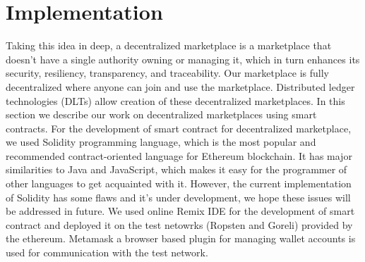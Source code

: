 \chapter{Implementation}
\label{cha:implementation}

Taking this idea in deep, a decentralized marketplace is a marketplace that doesn't have a single authority owning or managing it, which in turn enhances its security, resiliency, transparency, and traceability. Our marketplace is fully decentralized where anyone can join and use the marketplace. Distributed ledger technologies (DLTs) allow creation of these decentralized marketplaces. In this section we describe our work on decentralized marketplaces using smart contracts. For the development of smart contract for decentralized marketplace, we used Solidity programming language, which is the most popular and recommended contract-oriented language for Ethereum blockchain. It has major similarities to Java and JavaScript, which makes it easy for the programmer of other languages to get acquainted with it. However, the current implementation of Solidity has some flaws and it's under development, we hope these issues will be addressed in future. We used online Remix IDE for the development of smart contract and deployed it on the test netowrks (Ropsten and Goreli) provided by the ethereum. Metamask a browser based plugin for managing wallet accounts is used for communication with the test network. 

